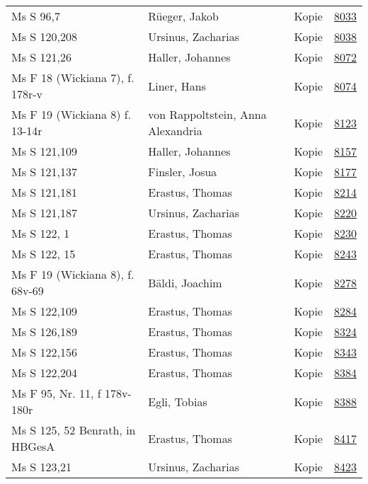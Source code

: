 \documentclass[10pt,a4paper,landscape]{report}
\begin{document}
\begin{longtable}{p{16cm}p{4cm}lr}
Ms S 96,7	&	Rüeger, Jakob	&	Kopie	&	\href{http://130.60.24.72/assignment/8033}{8033}\\
Ms S 120,208	&	Ursinus, Zacharias	&	Kopie	&	\href{http://130.60.24.72/assignment/8038}{8038}\\
Ms S 121,26	&	Haller, Johannes	&	Kopie	&	\href{http://130.60.24.72/assignment/8072}{8072}\\
Ms F 18 (Wickiana 7), f. 178r-v	&	Liner, Hans	&	Kopie	&	\href{http://130.60.24.72/assignment/8074}{8074}\\
Ms F 19 (Wickiana 8) f. 13-14r	&	von Rappoltstein, Anna Alexandria	&	Kopie	&	\href{http://130.60.24.72/assignment/8123}{8123}\\
Ms S 121,109	&	Haller, Johannes	&	Kopie	&	\href{http://130.60.24.72/assignment/8157}{8157}\\
Ms S 121,137	&	Finsler, Josua	&	Kopie	&	\href{http://130.60.24.72/assignment/8177}{8177}\\
Ms S 121,181	&	Erastus, Thomas	&	Kopie	&	\href{http://130.60.24.72/assignment/8214}{8214}\\
Ms S 121,187	&	Ursinus, Zacharias	&	Kopie	&	\href{http://130.60.24.72/assignment/8220}{8220}\\
Ms S 122, 1	&	Erastus, Thomas	&	Kopie	&	\href{http://130.60.24.72/assignment/8230}{8230}\\
Ms S 122, 15	&	Erastus, Thomas	&	Kopie	&	\href{http://130.60.24.72/assignment/8243}{8243}\\
Ms F 19 (Wickiana 8), f. 68v-69	&	Bäldi, Joachim	&	Kopie	&	\href{http://130.60.24.72/assignment/8278}{8278}\\
Ms S 122,109	&	Erastus, Thomas	&	Kopie	&	\href{http://130.60.24.72/assignment/8284}{8284}\\
Ms S 126,189	&	Erastus, Thomas	&	Kopie	&	\href{http://130.60.24.72/assignment/8324}{8324}\\
Ms S 122,156	&	Erastus, Thomas	&	Kopie	&	\href{http://130.60.24.72/assignment/8343}{8343}\\
Ms S 122,204	&	Erastus, Thomas	&	Kopie	&	\href{http://130.60.24.72/assignment/8384}{8384}\\
Ms F 95, Nr. 11, f  178v-180r	&	Egli, Tobias	&	Kopie	&	\href{http://130.60.24.72/assignment/8388}{8388}\\
Ms S 125, 52 Benrath, in HBGesA	&	Erastus, Thomas	&	Kopie	&	\href{http://130.60.24.72/assignment/8417}{8417}\\
Ms S 123,21	&	Ursinus, Zacharias	&	Kopie	&	\href{http://130.60.24.72/assignment/8423}{8423}\\

\end{longtable}
\end{document}
